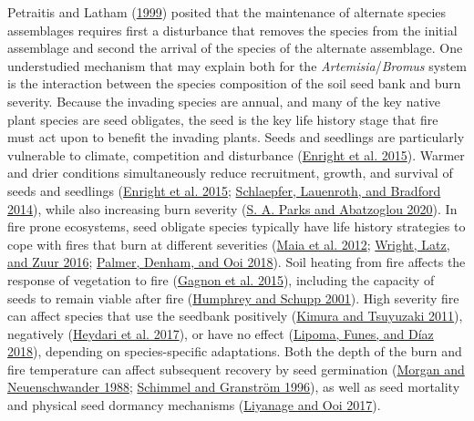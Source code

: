 \documentclass[
  12pt,
]{article}
\begin{document}
Petraitis and Latham (\protect\hyperlink{ref-Petraitis1999}{1999})
posited that the maintenance of alternate species assemblages requires
first a disturbance that removes the species from the initial assemblage
and second the arrival of the species of the alternate assemblage. One
understudied mechanism that may explain both for the
\emph{Artemisia}/\emph{Bromus} system is the interaction between the
species composition of the soil seed bank and burn severity. Because the
invading species are annual, and many of the key native plant species
are seed obligates, the seed is the key life history stage that fire
must act upon to benefit the invading plants. Seeds and seedlings are
particularly vulnerable to climate, competition and disturbance
(\protect\hyperlink{ref-Enright2015}{Enright et al. 2015}). Warmer and
drier conditions simultaneously reduce recruitment, growth, and survival
of seeds and seedlings (\protect\hyperlink{ref-Enright2015}{Enright et
al. 2015}; \protect\hyperlink{ref-Schlaepfer2014}{Schlaepfer, Lauenroth,
and Bradford 2014}), while also increasing burn severity
(\protect\hyperlink{ref-Parks2020}{S. A. Parks and Abatzoglou 2020}). In
fire prone ecosystems, seed obligate species typically have life history
strategies to cope with fires that burn at different severities
(\protect\hyperlink{ref-Maia2012}{Maia et al. 2012};
\protect\hyperlink{ref-Wright2016}{Wright, Latz, and Zuur 2016};
\protect\hyperlink{ref-Palmer2018}{Palmer, Denham, and Ooi 2018}). Soil
heating from fire affects the response of vegetation to fire
(\protect\hyperlink{ref-Gagnon2015}{Gagnon et al. 2015}), including the
capacity of seeds to remain viable after fire
(\protect\hyperlink{ref-Humphrey2001}{Humphrey and Schupp 2001}). High
severity fire can affect species that use the seedbank positively
(\protect\hyperlink{ref-Kimura2011}{Kimura and Tsuyuzaki 2011}),
negatively (\protect\hyperlink{ref-Heydari2017}{Heydari et al. 2017}),
or have no effect (\protect\hyperlink{ref-Lipoma2018}{Lipoma, Funes, and
Díaz 2018}), depending on species-specific adaptations. Both the depth
of the burn and fire temperature can affect subsequent recovery by seed
germination (\protect\hyperlink{ref-Morgan1988}{Morgan and
Neuenschwander 1988}; \protect\hyperlink{ref-Schimmel1996}{Schimmel and
Granström 1996}), as well as seed mortality and physical seed dormancy
mechanisms (\protect\hyperlink{ref-Liyanage2017}{Liyanage and Ooi
2017}).
\end{document}
